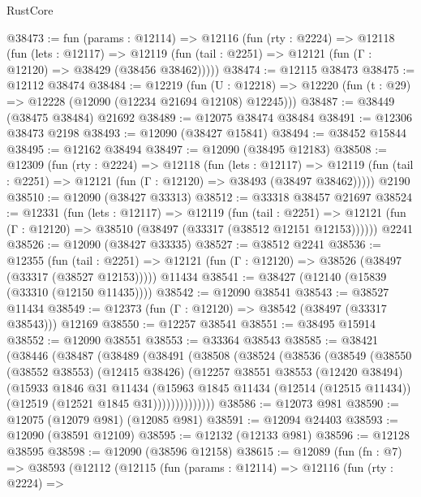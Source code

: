 \begin{lexlean}{RustCore}
\begin{coremodule}
@38473 := fun (params : @12114) =>
  @12116
    (fun (rty : @2224) =>
    @12118
      (fun (lets : @12117) =>
      @12119 (fun (tail : @2251) => @12121 (fun (Γ : @12120) => @38429 (@38456 @38462)))))
@38474 := @12115 @38473
@38475 := @12112 @38474
@38484 := @12219
    (fun (U : @12218) => @12220 (fun (t : @29) => @12228 (@12090 (@12234 @21694 @12108) @12245)))
@38487 := @38449 (@38475 @38484) @21692
@38489 := @12075 @38474 @38484
@38491 := @12306 @38473 @2198
@38493 := @12090 (@38427 @15841)
@38494 := @38452 @15844
@38495 := @12162 @38494
@38497 := @12090 (@38495 @12183)
@38508 := @12309
    (fun (rty : @2224) =>
    @12118
      (fun (lets : @12117) =>
      @12119 (fun (tail : @2251) => @12121 (fun (Γ : @12120) => @38493 (@38497 @38462)))))
    @2190
@38510 := @12090 (@38427 @33313)
@38512 := @33318 @38457 @21697
@38524 := @12331
    (fun (lets : @12117) =>
    @12119
      (fun (tail : @2251) =>
      @12121 (fun (Γ : @12120) => @38510 (@38497 (@33317 (@38512 @12151 @12153))))))
    @2241
@38526 := @12090 (@38427 @33335)
@38527 := @38512 @2241
@38536 := @12355
    (fun (tail : @2251) => @12121 (fun (Γ : @12120) => @38526 (@38497 (@33317 (@38527 @12153)))))
    @11434
@38541 := @38427 (@12140 (@15839 (@33310 (@12150 @11435))))
@38542 := @12090 @38541
@38543 := @38527 @11434
@38549 := @12373 (fun (Γ : @12120) => @38542 (@38497 (@33317 @38543))) @12169
@38550 := @12257 @38541
@38551 := @38495 @15914
@38552 := @12090 @38551
@38553 := @33364 @38543
@38585 := @38421
    (@38446
      (@38487
        (@38489
          (@38491
            (@38508
              (@38524
                (@38536
                  (@38549
                    (@38550
                      (@38552 @38553)
                      (@12415 @38426)
                      (@12257
                        @38551
                        @38553
                        (@12420 @38494)
                        (@15933
                          @1846
                          @31
                          @11434
                          (@15963
                            @1845
                            @11434
                            (@12514 (@12515 @11434))
                            (@12519 (@12521 @1845 @31))))))))))))))
@38586 := @12073 @981
@38590 := @12075 (@12079 @981) (@12085 @981)
@38591 := @12094 @24403
@38593 := @12090 (@38591 @12109)
@38595 := @12132 (@12133 @981)
@38596 := @12128 @38595
@38598 := @12090 (@38596 @12158)
@38615 := @12089
    (fun (fn : @7) =>
    @38593
      (@12112
        (@12115
          (fun (params : @12114) =>
          @12116
            (fun (rty : @2224) =>

\end{coremodule}
\end{lexlean}
